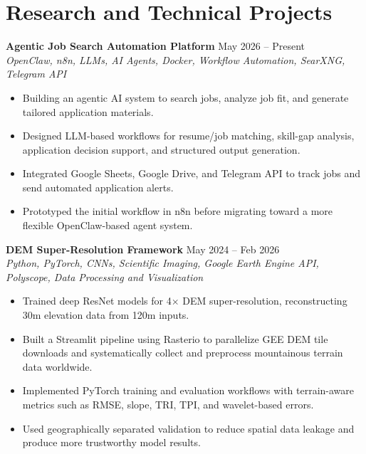 \documentclass[a4paper,10pt]{article}
\begin{document}

\section*{Research and Technical Projects}

\noindent
\textbf{Agentic Job Search Automation Platform} \hfill May 2026 -- Present \\
\textit{OpenClaw, n8n, LLMs, AI Agents, Docker, Workflow Automation, SearXNG, Telegram API}
\begin{itemize}[leftmargin=0.25in]
    \item Building an agentic AI system to search jobs, analyze job fit, and generate tailored application materials.
    \item Designed LLM-based workflows for resume/job matching, skill-gap analysis, application decision support, and structured output generation.
    \item Integrated Google Sheets, Google Drive, and Telegram API to track jobs and send automated application alerts.
    \item Prototyped the initial workflow in n8n before migrating toward a more flexible OpenClaw-based agent system.
\end{itemize}

\noindent
\textbf{DEM Super-Resolution Framework} \hfill May 2024 -- Feb 2026 \\
\textit{Python, PyTorch, CNNs, Scientific Imaging, Google Earth Engine API, Polyscope, Data Processing and Visualization}
\begin{itemize}[leftmargin=0.25in]
    \item Trained deep ResNet models for 4$\times$ DEM super-resolution, reconstructing 30m elevation data from 120m inputs.
    \item Built a Streamlit pipeline using Rasterio to parallelize GEE DEM tile downloads and systematically collect and preprocess mountainous terrain data worldwide.
    \item Implemented PyTorch training and evaluation workflows with terrain-aware metrics such as RMSE, slope, TRI, TPI, and wavelet-based errors.
    \item Used geographically separated validation to reduce spatial data leakage and produce more trustworthy model results.
\end{itemize}
\end{document}
